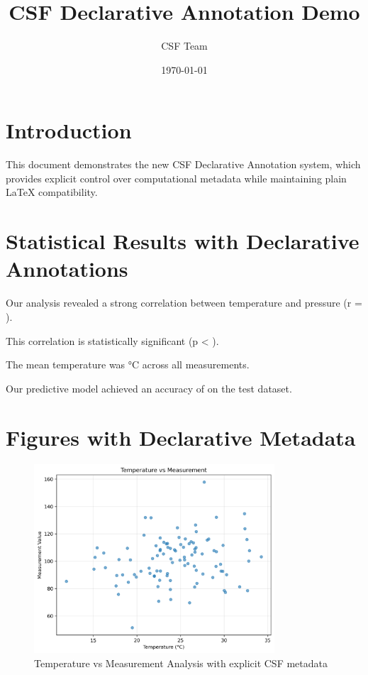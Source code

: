 \documentclass{article}
\title{CSF Declarative Annotation Demo}
\author{CSF Team}
\date{\today}
\begin{document}
\maketitle

\section{Introduction}

This document demonstrates the new CSF Declarative Annotation system, which provides 
explicit control over computational metadata while maintaining plain LaTeX compatibility.

\section{Statistical Results with Declarative Annotations}

Our analysis revealed a strong correlation between temperature and pressure
(r = ).

This correlation is statistically significant (p < ).

The mean temperature was °C across all measurements.

Our predictive model achieved an accuracy of  on the test dataset.

\section{Figures with Declarative Metadata}

\begin{figure}[h]
\centering
\includegraphics[width=0.8\textwidth]{figures/temperature_measurement.png}
\caption{Temperature vs Measurement Analysis with explicit CSF metadata}
\label{fig:temp_declarative}
\end{figure}
\end{document}
